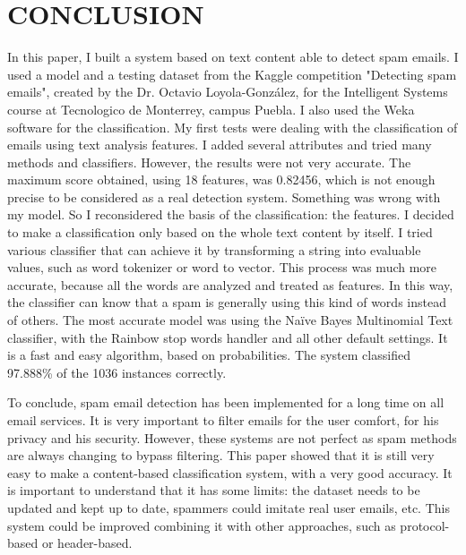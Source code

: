 \documentclass[runningheads]{llncs}
\begin{document}
\section{CONCLUSION}
%
In this paper, I built a system based on text content able to detect spam emails. I used a model and a testing dataset from the Kaggle competition "Detecting spam emails", created by the Dr. Octavio Loyola-González, for the Intelligent Systems course at Tecnologico de Monterrey, campus Puebla. I also used the Weka software for the classification. My first tests were dealing with the classification of emails using text analysis features. I added several attributes and tried many methods and classifiers. However, the results were not very accurate. The maximum score obtained, using 18 features, was 0.82456, which is not enough precise to be considered as a real detection system. Something was wrong with my model. So I reconsidered the basis of the classification: the features. I decided to make a classification only based on the whole text content by itself. I tried various classifier that can achieve it by transforming a string into evaluable values, such as word tokenizer or word to vector. This process was much more accurate, because all the words are analyzed and treated as features. In this way, the classifier can know that a spam is generally using this kind of words instead of others. The most accurate model was using the Naïve Bayes Multinomial Text classifier, with the Rainbow stop words handler and all other default settings. It is a fast and easy algorithm, based on probabilities. The system classified 97.888\% of the 1036 instances correctly. \\\par 
To conclude, spam email detection has been implemented for a long time on all email services. It is very important to filter emails for the user comfort, for his privacy and his security. However, these systems are not perfect as spam methods are always changing to bypass filtering. This paper showed that it is still very easy to make a content-based classification system, with a very good accuracy. It is important to understand that it has some limits: the dataset needs to be updated and kept up to date, spammers could imitate real user emails, etc. This system could be improved combining it with other approaches, such as protocol-based or header-based. \\
%
%
%
%
%


%
\end{document}
